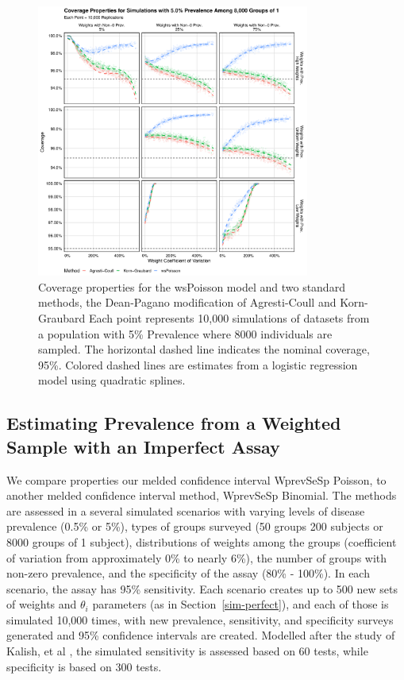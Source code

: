 \documentclass[AMA,STIX1COL]{WileyNJD-v2}
\begin{document}
\begin{figure}
\centering
\includegraphics[width=0.8\textwidth]{figures/perfect_coverage_8000_groups_0_05_prev.pdf}
\caption{Coverage properties for the wsPoisson model and two standard methods, the Dean-Pagano modification of Agresti-Coull and Korn-Graubard
Each point represents 10,000 simulations of datasets from a population with 5\% Prevalence where 8000 individuals are sampled.
The horizontal dashed line indicates the nominal coverage, 95\%.
Colored dashed lines are estimates from a logistic regression model using quadratic splines.}
\label{fig:perfect_coverage_8000_groups_0_05_prev}
\end{figure}


\subsection{Estimating Prevalence from a Weighted Sample with an Imperfect Assay}

We compare properties our melded confidence interval WprevSeSp Poisson, to another melded confidence interval method, WprevSeSp Binomial.
The methods are assessed in a several simulated scenarios with varying levels of disease prevalence (0.5\% or 5\%), types of groups surveyed (50 groups 200 subjects or 8000 groups of 1 subject), distributions of weights among the groups (coefficient of variation from approximately 0\% to nearly 6\%), the number of groups with non-zero prevalence, and the specificity of the assay (80\% - 100\%).
In each scenario, the assay has 95\% sensitivity.
Each scenario creates up to 500 new sets of weights and $\theta_i$ parameters (as in Section~\ref{sim-perfect}), and each of those is simulated 10,000 times, with new prevalence, sensitivity, and specificity surveys generated and 95\% confidence intervals are created.
Modelled after the study of Kalish, et al \cite{Kali:2021}, the simulated sensitivity is assessed based on 60 tests, while specificity is based on 300 tests.
\end{document}

